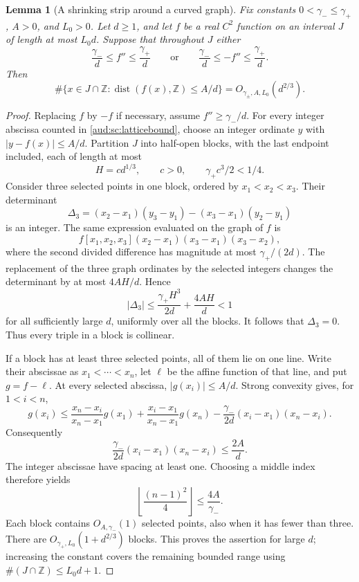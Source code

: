 \documentclass[11pt,a4paper]{article}
\numberwithin{equation}{section}
\newtheorem{lemma}[theorem]{Lemma}
\begin{document}
\begin{lemma}[A shrinking strip around a curved graph]\label{aud:sc:lattice}
Fix constants $0<\gamma_-\le\gamma_+$, $A>0$, and $L_0>0$.  Let $d\ge1$, and let $f$ be a
real $C^2$ function on an interval $J$ of length at most $L_0d$.  Suppose that
throughout $J$ either
\[
 \frac{\gamma_-}d\le f''\le\frac{\gamma_+}d
 \qquad\text{or}\qquad
 \frac{\gamma_-}d\le -f''\le\frac{\gamma_+}d.
\]
Then
\begin{equation}\label{aud:sc:latticebound}
 \#\bigl\{x\in J\cap\mathbb Z:
       \operatorname{dist}(f(x),\mathbb Z)\le A/d\bigr\}
 =O_{\gamma_\pm,A,L_0}(d^{2/3}).
\end{equation}
\end{lemma}
\begin{proof}
Replacing $f$ by $-f$ if necessary, assume $f''\ge\gamma_-/d$.  For every integer
abscissa counted in \eqref{aud:sc:latticebound}, choose an integer ordinate $y$
with $|y-f(x)|\le A/d$.  Partition $J$ into half-open blocks, with the last
endpoint included, each of length at most
\[
 H=c d^{1/3},\qquad c>0,\qquad \gamma_+c^3/2<1/4.
\]
Consider three selected points in one block, ordered by $x_1<x_2<x_3$.
Their determinant
\[
 \Delta_3=(x_2-x_1)(y_3-y_1)-(x_3-x_1)(y_2-y_1)
\]
is an integer.  The same expression evaluated on the graph of $f$ is
\[
 f[x_1,x_2,x_3](x_2-x_1)(x_3-x_1)(x_3-x_2),
\]
where the second divided difference has magnitude at most $\gamma_+/(2d)$.
The replacement of the three graph ordinates by the selected integers
changes the determinant by at most $4AH/d$.  Hence
\[
 |\Delta_3|\le\frac{\gamma_+H^3}{2d}+\frac{4AH}{d}<1
\]
for all sufficiently large $d$, uniformly over all the blocks.  It follows
that $\Delta_3=0$.  Thus every triple in a block is collinear.

If a block has at least three selected points, all of them lie on one line.
Write their abscissae as $x_1<\cdots<x_n$, let $\ell$ be the affine function
of that line, and put $g=f-\ell$.  At every selected abscissa,
$|g(x_i)|\le A/d$.  Strong convexity gives, for $1<i<n$,
\[
 g(x_i)\le
 \frac{x_n-x_i}{x_n-x_1}g(x_1)
 +\frac{x_i-x_1}{x_n-x_1}g(x_n)
 -\frac{\gamma_-}{2d}(x_i-x_1)(x_n-x_i).
\]
Consequently
\[
 \frac{\gamma_-}{2d}(x_i-x_1)(x_n-x_i)\le\frac{2A}{d}.
\]
The integer abscissae have spacing at least one.  Choosing a middle index
therefore yields
\[
 \left\lfloor\frac{(n-1)^2}{4}\right\rfloor\le\frac{4A}{\gamma_-}.
\]
Each block contains $O_{A,\gamma_-}(1)$ selected points, also when it has fewer than
three.  There are $O_{\gamma_+,L_0}(1+d^{2/3})$ blocks.  This proves the assertion
for large $d$; increasing the constant covers the remaining bounded range
using $\#(J\cap\mathbb Z)\le L_0d+1$.
\end{proof}
\end{document}
